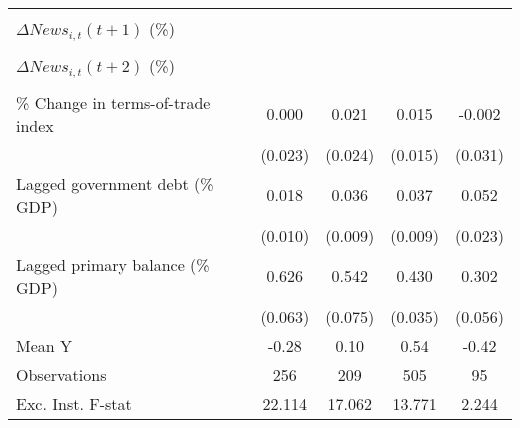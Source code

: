 {\begin{tabular}{l*{4}{c}}
                    &                     &                     &                     &                     \\
\addlinespace
$ \Delta News_{i,t}(t+1)$ (\%)&                     &                     &                     &                     \\
                    &                     &                     &                     &                     \\
\addlinespace
$ \Delta News_{i,t}(t+2)$ (\%)&                     &                     &                     &                     \\
                    &                     &                     &                     &                     \\
\addlinespace
\% Change in terms-of-trade index&       0.000         &       0.021         &       0.015         &      -0.002         \\
                    &     (0.023)         &     (0.024)         &     (0.015)         &     (0.031)         \\
\addlinespace
Lagged government debt (\% GDP)&       0.018\sym{*}  &       0.036\sym{***}&       0.037\sym{***}&       0.052\sym{**} \\
                    &     (0.010)         &     (0.009)         &     (0.009)         &     (0.023)         \\
\addlinespace
Lagged primary balance (\% GDP)&       0.626\sym{***}&       0.542\sym{***}&       0.430\sym{***}&       0.302\sym{***}\\
                    &     (0.063)         &     (0.075)         &     (0.035)         &     (0.056)         \\
\midrule
Mean Y              &       -0.28         &        0.10         &        0.54         &       -0.42         \\
Observations        &         256         &         209         &         505         &          95         \\
Exc. Inst. F-stat   &      22.114         &      17.062         &      13.771         &       2.244         \\
\bottomrule
\end{tabular}
}
